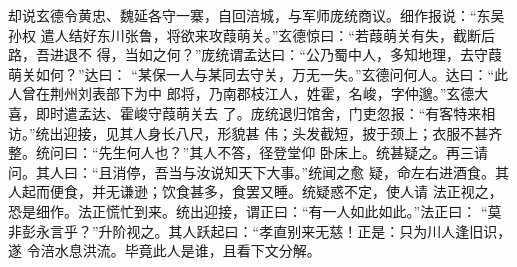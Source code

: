 却说玄德令黄忠、魏延各守一寨，自回涪城，与军师庞统商议。细作报说：“东吴孙权
遣人结好东川张鲁，将欲来攻葭萌关。”玄德惊曰：“若葭萌关有失，截断后路，吾进退不
得，当如之何？”庞统谓孟达曰：“公乃蜀中人，多知地理，去守葭萌关如何？”达曰：
“某保一人与某同去守关，万无一失。”玄德问何人。达曰：“此人曾在荆州刘表部下为中
郎将，乃南郡枝江人，姓霍，名峻，字仲邈。”玄德大喜，即时遣孟达、霍峻守葭萌关去
了。庞统退归馆舍，门吏忽报：“有客特来相访。”统出迎接，见其人身长八尺，形貌甚
伟；头发截短，披于颈上；衣服不甚齐整。统问曰：“先生何人也？”其人不答，径登堂仰
卧床上。统甚疑之。再三请问。其人曰：“且消停，吾当与汝说知天下大事。”统闻之愈
疑，命左右进酒食。其人起而便食，并无谦逊；饮食甚多，食罢又睡。统疑惑不定，使人请
法正视之，恐是细作。法正慌忙到来。统出迎接，谓正曰：“有一人如此如此。”法正曰：
“莫非彭永言乎？”升阶视之。其人跃起曰：“孝直别来无慈！正是：只为川人逢旧识，遂
令涪水息洪流。毕竟此人是谁，且看下文分解。